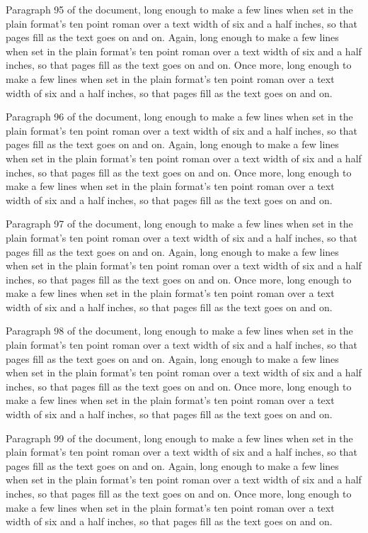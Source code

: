 Paragraph 95 of the document, long enough to make a few lines when set in the plain format's ten point roman over a text width of six and a half inches, so that pages fill as the text goes on and on. Again, long enough to make a few lines when set in the plain format's ten point roman over a text width of six and a half inches, so that pages fill as the text goes on and on. Once more, long enough to make a few lines when set in the plain format's ten point roman over a text width of six and a half inches, so that pages fill as the text goes on and on.

Paragraph 96 of the document, long enough to make a few lines when set in the plain format's ten point roman over a text width of six and a half inches, so that pages fill as the text goes on and on. Again, long enough to make a few lines when set in the plain format's ten point roman over a text width of six and a half inches, so that pages fill as the text goes on and on. Once more, long enough to make a few lines when set in the plain format's ten point roman over a text width of six and a half inches, so that pages fill as the text goes on and on.

Paragraph 97 of the document, long enough to make a few lines when set in the plain format's ten point roman over a text width of six and a half inches, so that pages fill as the text goes on and on. Again, long enough to make a few lines when set in the plain format's ten point roman over a text width of six and a half inches, so that pages fill as the text goes on and on. Once more, long enough to make a few lines when set in the plain format's ten point roman over a text width of six and a half inches, so that pages fill as the text goes on and on.

Paragraph 98 of the document, long enough to make a few lines when set in the plain format's ten point roman over a text width of six and a half inches, so that pages fill as the text goes on and on. Again, long enough to make a few lines when set in the plain format's ten point roman over a text width of six and a half inches, so that pages fill as the text goes on and on. Once more, long enough to make a few lines when set in the plain format's ten point roman over a text width of six and a half inches, so that pages fill as the text goes on and on.

Paragraph 99 of the document, long enough to make a few lines when set in the plain format's ten point roman over a text width of six and a half inches, so that pages fill as the text goes on and on. Again, long enough to make a few lines when set in the plain format's ten point roman over a text width of six and a half inches, so that pages fill as the text goes on and on. Once more, long enough to make a few lines when set in the plain format's ten point roman over a text width of six and a half inches, so that pages fill as the text goes on and on.

